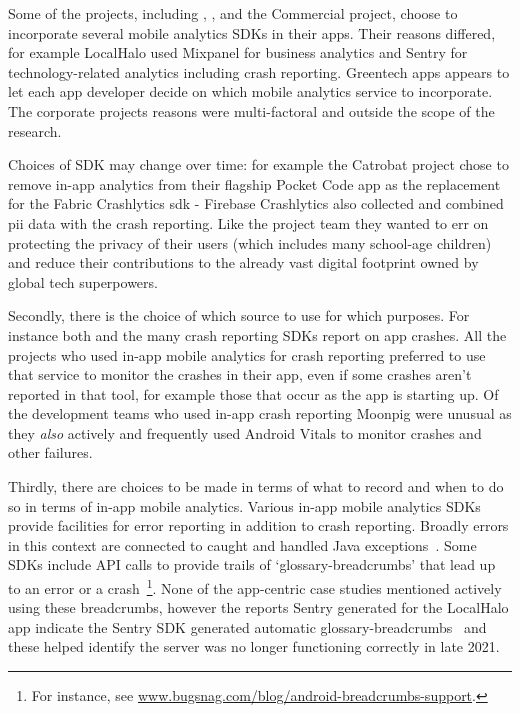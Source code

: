 Some of the projects, including , , and the Commercial project, choose to incorporate several mobile analytics SDKs in their apps. Their reasons differed, for example LocalHalo used Mixpanel for business analytics and Sentry for technology-related analytics including crash reporting. Greentech apps appears to let each app developer decide on which mobile analytics service to incorporate. The corporate projects reasons were multi-factoral and outside the scope of the research.

Choices of SDK may change over time: for example the Catrobat project chose to remove in-app analytics from their flagship Pocket Code app as the replacement for the Fabric Crashlytics \Gls{sdk} - Firebase Crashlytics also collected and combined \Gls{pii} data with the crash reporting. Like the  project team they wanted to err on protecting the privacy of their users (which includes many school-age children) and reduce their contributions to the already vast digital footprint owned by global tech superpowers.

Secondly, there is the choice of which source to use for which purposes. For instance both  and the many crash reporting SDKs report on app crashes. All the projects who used in-app mobile analytics for crash reporting preferred to use that service to monitor the crashes in their app, even if some crashes aren't reported in that tool, for example those that occur as the app is starting up. Of the development teams who used in-app crash reporting Moonpig were unusual as they \emph{also} actively and frequently used Android Vitals to monitor crashes and other failures.

Thirdly, there are choices to be made in terms of what to record and when to do so in terms of in-app mobile analytics. Various in-app mobile analytics SDKs provide facilities for error reporting in addition to crash reporting. Broadly errors in this context are connected to caught and handled Java exceptions~. Some SDKs include API calls to provide trails of `\gls{glossary-breadcrumbs}' that lead up to an error or a crash~\footnote{For instance, see \href{https://www.bugsnag.com/blog/android-breadcrumbs-support}{www.bugsnag.com/blog/android-breadcrumbs-support}.}. None of the app-centric case studies mentioned actively using these breadcrumbs, however the reports Sentry generated for the LocalHalo app indicate the Sentry SDK generated automatic \gls{glossary-breadcrumbs}~ and these helped identify the server was no longer functioning correctly in late 2021. 

